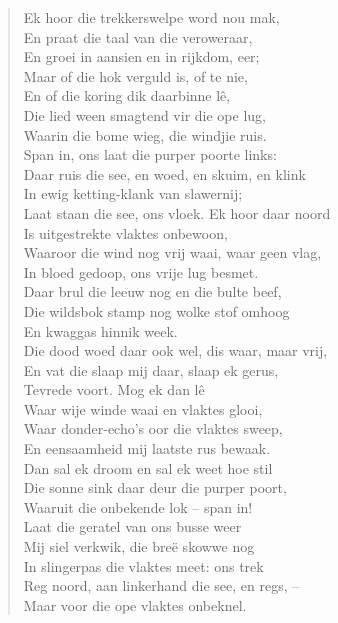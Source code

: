 \begin{verse}
Ek hoor die trekkerswelpe word nou mak, \\ 
En praat die taal van die veroweraar, \\ 
En groei in aansien en in rijkdom, eer; \\ 
Maar of die hok verguld is, of te nie, \\ 
En of die koring dik daarbinne lê, \\ 
Die lied ween smagtend vir die ope lug, \\ 
Waarin die bome wieg, die windjie ruis. \\ 
Span in, ons laat die purper poorte links: \\ 
Daar ruis die see, en woed, en skuim, en klink \\ 
In ewig ketting-klank van slawernij; \\ 
Laat staan die see, ons vloek. Ek hoor daar noord \\ 
Is uitgestrekte vlaktes onbewoon, \\ 
Waaroor die wind nog vrij waai, waar geen vlag, \\ 
In bloed gedoop, ons vrije lug besmet. \\ 
Daar brul die leeuw nog en die bulte beef, \\ 
Die wildsbok stamp nog wolke stof omhoog \\ 
En kwaggas hinnik week. \\ 
Die dood woed daar ook wel, dis waar, maar vrij, \\ 
En vat die slaap mij daar, slaap ek gerus, \\ 
Tevrede voort. Mog ek dan lê \\ 
Waar wije winde waai en vlaktes glooi, \\ 
Waar donder-echo’s oor die vlaktes sweep, \\ 
En eensaamheid mij laatste rus bewaak. \\ 
Dan sal ek droom en sal ek weet hoe stil \\ 
Die sonne sink daar deur die purper poort, \\ 
Waaruit die onbekende lok -- span in! \\ 
Laat die geratel van ons busse weer \\ 
Mij siel verkwik, die bre\"e skowwe nog \\ 
In slingerpas die vlaktes meet: ons trek \\ 
Reg noord, aan linkerhand die see, en regs, --  \\ 
Maar voor die ope vlaktes onbeknel. \\ 
\end{verse}
